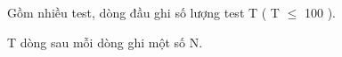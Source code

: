 Gồm nhiều test, dòng đầu ghi số lượng test T ( T $\le$ 100 ).   


   T dòng sau mỗi dòng ghi một số N.